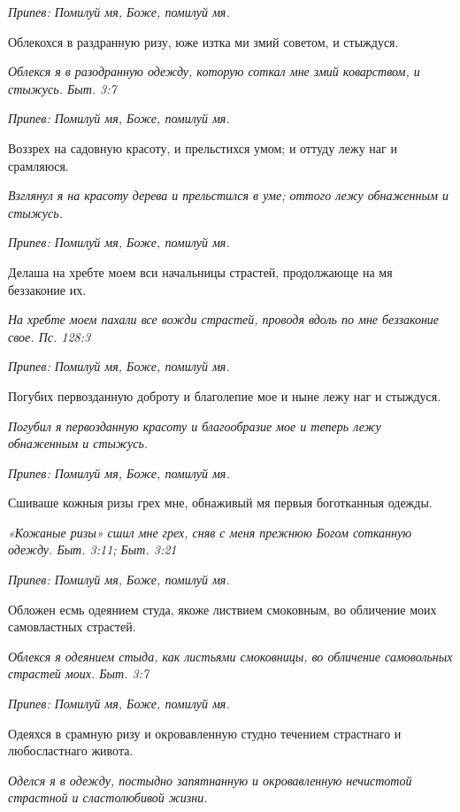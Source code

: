 \itshape Припев:\normalfont{} Помилуй мя, Боже, помилуй мя.


Облекохся в раздранную ризу, юже изтка ми змий советом, и стыждуся.


\itshape Облекся я в разодранную одежду, которую соткал мне змий коварством, и стыжусь. Быт. 3:7\normalfont{}


\itshape Припев:\normalfont{} Помилуй мя, Боже, помилуй мя.


Воззрех на садовную красоту, и прельстихся умом; и оттуду лежу наг и срамляюся.


\itshape Взглянул я на красоту дерева и прельстился в уме; оттого лежу обнаженным и стыжусь.\normalfont{}


\itshape Припев:\normalfont{} Помилуй мя, Боже, помилуй мя.


Делаша на хребте моем вси начальницы страстей, продолжающе на мя беззаконие их.


\itshape На хребте моем пахали все вожди страстей, проводя вдоль по мне беззаконие свое. Пс. 128:3\normalfont{}


\itshape Припев:\normalfont{} Помилуй мя, Боже, помилуй мя.


Погубих первозданную доброту и благолепие мое и ныне лежу наг и стыждуся.


\itshape Погубил я первозданную красоту и благообразие мое и теперь лежу обнаженным и стыжусь.\normalfont{}


\itshape Припев:\normalfont{} Помилуй мя, Боже, помилуй мя.


Сшиваше кожныя ризы грех мне, обнаживый мя первыя боготканныя одежды.


\itshape «Кожаные ризы» сшил мне грех, сняв с меня прежнюю Богом сотканную одежду. Быт. 3:11; Быт. 3:21\normalfont{}


\itshape Припев:\normalfont{} Помилуй мя, Боже, помилуй мя.


Обложен есмь одеянием студа, якоже листвием смоковным, во обличение моих самовластных страстей.


\itshape Облекся я одеянием стыда, как листьями смоковницы, во обличение самовольных страстей моих. Быт. 3:7\normalfont{}


\itshape Припев:\normalfont{} Помилуй мя, Боже, помилуй мя.


Одеяхся в срамную ризу и окровавленную студно течением страстнаго и любосластнаго живота.


\itshape Оделся я в одежду, постыдно запятнанную и окровавленную нечистотой страстной и сластолюбивой жизни.\normalfont{}



